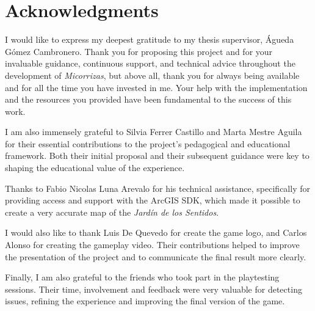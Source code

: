 
\chapter*{Acknowledgments}
I would like to express my deepest gratitude to my thesis supervisor, Águeda Gómez Cambronero. Thank you for proposing this project and for your invaluable guidance, continuous support, and technical advice throughout the development of \textit{Micorrizas}, but above all, thank you for always being available and for all the time you have invested in me. Your help with the implementation and the resources you provided have been fundamental to the success of this work.

I am also immensely grateful to Silvia Ferrer Castillo and Marta Mestre Aguila for their essential contributions to the project’s pedagogical and educational framework. Both their initial proposal and their subsequent guidance were key to shaping the educational value of the experience.

Thanks to Fabio Nicolas Luna Arevalo for his technical assistance, specifically for providing access and support with the ArcGIS SDK, which made it possible to create a very accurate map of the \textit{Jardín de los Sentidos}.

I would also like to thank Luis De Quevedo for create the game logo, and Carlos Alonso for creating the gameplay video. Their contributions helped to improve the presentation of the project and to communicate the final result more clearly.

Finally, I am also grateful to the friends who took part in the playtesting sessions. Their time, involvement and feedback were very valuable for detecting issues, refining the experience and improving the final version of the game.

\clearpage

